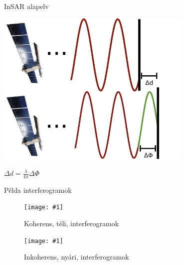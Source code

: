\documentclass{beamer}
\newcommand\figu[3]{
    \begin{figure}
        \texttt{[image: \#1]}
        \caption{#3}
    \end{figure}
}
\begin{document}
\begin{frame}{InSAR alapelv}
    
    \begin{center}
        \includegraphics[width=0.7\textwidth]{interfero.png}
        
        $\Delta d = \frac{\lambda}{4\pi} \Delta \Phi$
    \end{center}
\end{frame}

\begin{frame}{Példa interferogramok}



\begin{center}
    \figu{hun_nkp1.png}{0.6}{Koherens, téli, interferogramok}
    \figu{hun_nkp3.png}{0.6}{Inkoherens, nyári, interferogramok}
\end{center}

\end{frame}
\end{document}
